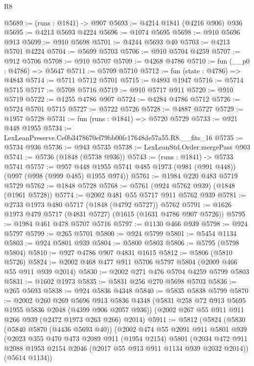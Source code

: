 \begin{lexlean}{R8}
\begin{coremodule}
@5689 := (runs : @1841) -> @907
@5693 := @4214 @1841 (@4216 @906) @936
@5695 := @4213 @5693 @4224
@5696 := @1074 @5695
@5698 := @910 @5696 @913
@5699 := @910 @5698
@5701 := @4244 @5693 @40
@5703 := @4213 @5701 @4224
@5704 := @5699 @5703
@5706 := @910 @5704 @4259
@5707 := @912 @5706
@5708 := @910 @5707
@5709 := @4268 @4786
@5710 := fun (__p0 : @4786) => @5647
@5711 := @5709 @5710
@5712 := fun (state : @4786) => @4843
@5714 := @5711 @5712 @5701
@5715 := @4893 @1947
@5716 := @5714 @5715
@5717 := @5708 @5716
@5719 := @910 @5717 @911
@5720 := @910 @5719
@5722 := @1255 @4786 @907
@5724 := @4284 @4786 @5712
@5726 := @5724 @5701 @5715
@5727 := @5722 @5726
@5728 := @4887 @5727
@5729 := @1957 @5728
@5731 := fun (runs : @1841) => @5720 @5729
@5733 := @921 @448 @1955
@5734 := LexLeanPreserve.Ce0b3478670ef79bb00fc17648de57a55.R8.__fits_16
@5735 := @5734 @936
@5736 := @943 @5735
@5738 := LexLeanStd.Order.mergePass @903
@5741 := @5736 (@1848 (@5738 @936))
@5743 := (runs : @1841) -> @5733 @5741
@5757 := @957 @448 @1955 @5741 @485 @1973 (@981 (@991 @448)) (@997 (@998 (@999 @485) @1955 @974))
@5761 := @1984 @220 @483 @5719 @5729
@5762 := @1848 @5728
@5768 := @5761 (@924 @5762 @939) (@1848 (@1961 @5728))
@5774 := @2002 @481 @55 @5717 @911 @5762 @939
@5781 := @2733 @1973 @480 @5717 (@1848 (@4792 @5727)) @5762
@5791 := @1626 @1973 @479 @5717 (@4831 @5727) (@1615 (@1631 @4786 @907 @5726))
@5795 := @1984 @461 @478 @5707 @5716
@5797 := @1130 @466 @939
@5798 := @924 @5797
@5799 := @265 @5701
@5800 := @924 @5799
@5801 := @5454 @1134
@5803 := @924 @5801 @939
@5804 := @5800 @5803
@5806 := @5795 (@5798 @5804)
@5810 := @927 @4786 @907 @4831 @1615
@5812 := @5806 (@5810 @5726)
@5824 := @2002 @468 @477 @911 @5706 @5797 @5804 (@2009 @466 @55 @911 @939 @2014)
@5830 := @2002 @271 @476 @5704 @4259 @5799 @5803
@5831 := @1602 @1973
@5835 := @5831 @256 @270 @5698 @5703
@5836 := @265 @5693
@5838 := @924 @5836 @4348
@5840 := @5835 @5838 @5799
@5870 := @2002
    @260
    @269
    @5696
    @913
    @5836
    @4348
    (@5831 @258 @72 @913 @5695 @1955 @5836 @2048 (@4399 @906 @2057 @936))
    (@2002 @267 @55 @911 @911 @266 @939 (@2472 @1973 @263 @266) @2014)
@5911 := @5812
    (@5824
      (@5830
        (@5840 @5870 (@4436 @5693 @40))
        (@2002
          @474
          @55
          @2091
          @911
          @5801
          @939
          (@2023
            @355
            @470
            @473
            @2089
            @911
            (@1954 @2154)
            @5801
            (@2034 @472 @911 @2088 @1953 @2154 @2046 (@2017 @55 @913 @911 @1134 @939 @2032 @2014))
            (@5614 @1134))

\end{coremodule}
\end{lexlean}
